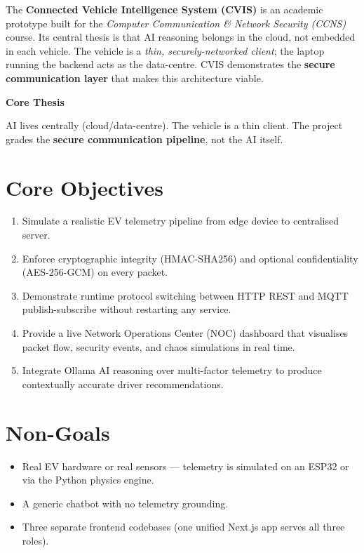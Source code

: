 \documentclass[12pt,a4paper]{report}
\newenvironment{ccnsbox}[1]{%
  \begin{mdframed}[backgroundcolor=cvislightbg,
    linecolor=cvisblue,linewidth=1.5pt,
    innerleftmargin=10pt,innerrightmargin=10pt,
    innertopmargin=6pt,innerbottommargin=6pt]
  \textbf{\color{cvisblue}#1}\par\smallskip}
  {\end{mdframed}}
\begin{document}
The \textbf{Connected Vehicle Intelligence System (CVIS)} is an academic prototype built for the \textit{Computer Communication \& Network Security (CCNS)} course. Its central thesis is that AI reasoning belongs in the cloud, not embedded in each vehicle. The vehicle is a \textit{thin, securely-networked client}; the laptop running the backend acts as the data-centre. CVIS demonstrates the \textbf{secure communication layer} that makes this architecture viable.

\begin{ccnsbox}{Core Thesis}
AI lives centrally (cloud/data-centre). The vehicle is a thin client. The project grades the \textbf{secure communication pipeline}, not the AI itself.
\end{ccnsbox}

\section{Core Objectives}
\begin{enumerate}[leftmargin=1.8cm]
  \item Simulate a realistic EV telemetry pipeline from edge device to centralised server.
  \item Enforce cryptographic integrity (HMAC-SHA256) and optional confidentiality (AES-256-GCM) on every packet.
  \item Demonstrate runtime protocol switching between HTTP REST and MQTT publish-subscribe without restarting any service.
  \item Provide a live Network Operations Center (NOC) dashboard that visualises packet flow, security events, and chaos simulations in real time.
  \item Integrate Ollama AI reasoning over multi-factor telemetry to produce contextually accurate driver recommendations.
\end{enumerate}

\section{Non-Goals}
\begin{itemize}
  \item Real EV hardware or real sensors — telemetry is simulated on an ESP32 or via the Python physics engine.
  \item A generic chatbot with no telemetry grounding.
  \item Three separate frontend codebases (one unified Next.js app serves all three roles).
\end{itemize}
\end{document}
